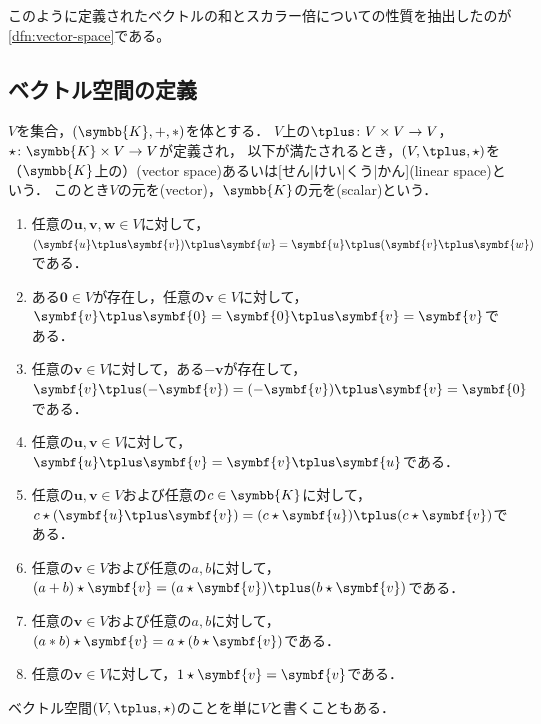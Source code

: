 \documentclass[../sotsu.tex]{subfiles}
\begin{document}
このように定義されたベクトルの和とスカラー倍についての性質を抽出したのが\cref{dfn:vector-space}である。



\subsection{ベクトル空間の定義}

\begin{definition}[ベクトル空間]
    \label{dfn:vector-space}
    $V$を集合，$(\symbb{K}, +, \dotprod)$を体とする．
    $V$上の$\vecplus\colon V \times V \to V$，$\scaprod \colon \symbb{K} \times V \to V$が定義され，
    以下が満たされるとき，$(V, \vecplus, \scaprod)$を（$\symbb{K}$上の）(vector space)あるいは[せん|けい|くう|かん](linear space)という．
    このとき$V$の元を(vector)，$\symbb{K}$の元を(scalar)という．
    \begin{enumerate}
        \item \label{vector:sum-associative} 任意の$\symbf{u}, \symbf{v}, \symbf{w} \in V$に対して，$(\symbf{u} \vecplus \symbf{v}) \vecplus \symbf{w} = \symbf{u} \vecplus (\symbf{v} \vecplus \symbf{w})$である．
        \item \label{vector:sum-zero} ある$\symbf{0} \in V$が存在し，任意の$\symbf{v} \in V$に対して，$\symbf{v} \vecplus \symbf{0} = \symbf{0} \vecplus \symbf{v} = \symbf{v}$である．
        \item \label{vector:sum-opposite} 任意の$\symbf{v} \in V$に対して，ある$-\symbf{v}$が存在して，$\symbf{v} \vecplus (-\symbf{v}) = (-\symbf{v}) \vecplus \symbf{v} = \symbf{0}$である．
        \item \label{vector:sum-commutative} 任意の$\symbf{u}, \symbf{v} \in V$に対して，$\symbf{u} \vecplus \symbf{v} = \symbf{v} \vecplus \symbf{u}$である．
        \item \label{vector:scalar-distributive} 任意の$\symbf{u}, \symbf{v} \in V$および任意の$c \in \symbb{K}$に対して，$c \scaprod (\symbf{u} \vecplus \symbf{v}) = (c \scaprod \symbf{u}) \vecplus (c \scaprod \symbf{v})$である．
        \item \label{vector:scalar-sum} 任意の$\symbf{v} \in V$および任意の$a, b$に対して，$(a + b) \scaprod \symbf{v} = (a \scaprod \symbf{v}) \vecplus (b \scaprod \symbf{v})$である．
        \item \label{vector:scalar-prod} 任意の$\symbf{v} \in V$および任意の$a, b$に対して，$(a \dotprod b) \scaprod \symbf{v} = a \scaprod (b \scaprod \symbf{v})$である．
        \item \label{vector:scalar-identity} 任意の$\symbf{v} \in V$に対して，$1 \scaprod \symbf{v} = \symbf{v}$である．
    \end{enumerate}
    ベクトル空間$(V, \vecplus, \scaprod)$のことを単に$V$と書くこともある．
\end{definition}
\end{document}
